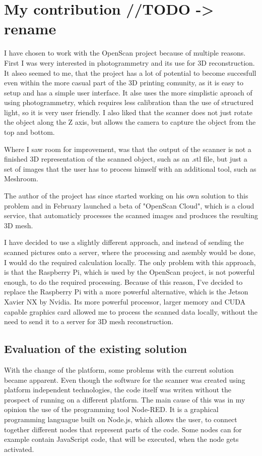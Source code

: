 \chapter{My contribution //TODO -> rename}
\label{sec:contribution}
I have chosen to work with the OpenScan project because of multiple reasons.
First I was wery interested in photogrammetry and its use for 3D reconstruction.
It alseo seemed to me, that the project has a lot of potential to become succesfull even within the more casual part of the 3D printing comunity, as it is easy to setup and has a simple user interface.
It alse uses the more simplistic aproach of using photogrammetry, which requires less calibration than the use of structured light, so it is very user friendly.
I also liked that the scanner does not just rotate the object along the Z axis, but allows the camera to capture the object from the top and bottom.

Where I saw room for improvement, was that the output of the scanner is not a finished 3D representation of the scanned object, such as an .stl file, but just a set of images that the user has to process himself with an additional tool, such as Meshroom.

The author of the project has since started working on his own solution to this problem and in February launched a beta of "OpenScan Cloud", which is a cloud service, that automaticly processes the scanned images and produces the resulting 3D mesh. \cite{openscanCloud}

I have decided to use a slightly different approach, and instead of sending the scanned pictures onto a server, where the processing and asembly would be done, I would do the required calculation locally.
The only problem with this approach, is that the Raspberry Pi, which is used by the OpenScan project, is not powerful enough, to do the required processing.
Because of this reason, I've decided to replace the Raspberry Pi with a more powerful alternative, which is the Jetson Xavier NX by Nvidia.
Its more powerful processor, larger memory and CUDA capable graphics card allowed me to process the scanned data locally, without the need to send it to a server for 3D mesh reconstruction.

\section{Evaluation of the existing solution}
With the change of the platform, some problems with the current solution became apparent.
Even though the software for the scanner was created using platform independent technologies, the code itself was writen without the prospect of running on a different platform.
The main cause of this was in my opinion the use of the programming tool Node-RED.
It is a graphical programming languague built on Node.js, which allows the user, to connect together different nodes that represent parts of the code. \cite{node-red}
Some nodes can for example contain JavaScript code, that will be executed, when the node gets activated.

